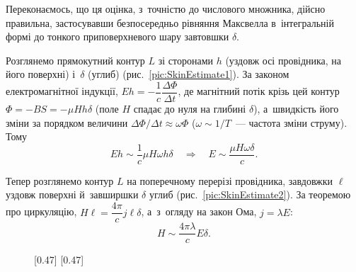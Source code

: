 Переконаємось, що ця оцінка, з~точністю до числового множника, дійсно правильна,
застосувавши безпосередньо рівняння Максвелла в~інтегральній формі до тонкого
приповерхневого шару завтовшки $\delta$.

 Розглянемо прямокутний контур $L$ зі сторонами $h$ (уздовж
осі провідника, на його поверхні) і~$\delta$ (углиб) (рис.~\ref{pic:SkinEstimate1}). За
законом електромагнітної індукції, $Eh = -\dfrac1c\dfrac{\Delta\Phi}{\Delta t}$, де
магнітний потік крізь цей контур $\Phi = -BS = -\mu H h\delta$ (поле $H$ спадає до нуля на
глибині $\delta$), а~швидкість його зміни за порядком величини $\Delta\Phi/\Delta t
\approx \omega\Phi$ ($\omega\sim1/T$~--- частота зміни струму). Тому
\begin{equation}\label{eq:SkinCirculationE}
	Eh \sim \frac1c\mu H\omega h\delta \quad\Rightarrow\quad E \sim \frac{\mu H\omega\delta}{c}.
\end{equation}


 Тепер розглянемо контур $L$ на поперечному перерізі
провідника, завдовжки $\ell$ уздовж поверхні й~завширшки $\delta$ углиб
(рис.~\ref{pic:SkinEstimate2}). За теоремою про циркуляцію, $H\ell =
\dfrac{4\pi}{c}j\ell\delta$, а~з~огляду на закон Ома, $j=\lambda E$:
\begin{equation}\label{eq:SkinCirculationH}
	H \sim \frac{4\pi\lambda}{c}E\delta.
\end{equation}

\begin{figure}[h!]
	\centering
	[0.47\textwidth]{%
	} \hfill %
	[0.47\textwidth]{%
	}
\end{figure}

